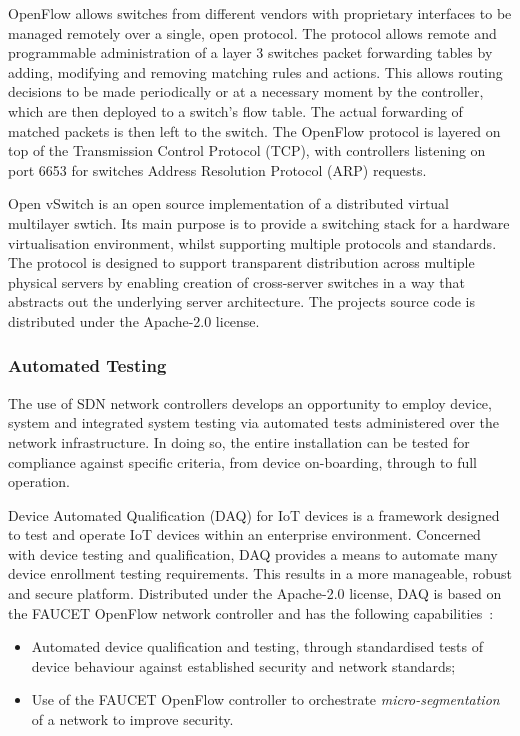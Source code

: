 \documentclass[11pt, oneside]{book}   	%
\begin{document}
OpenFlow allows switches from different vendors with proprietary interfaces to be managed remotely over a single, open protocol.
The protocol allows remote and programmable administration of a layer 3 switches packet forwarding tables by adding, modifying and removing matching rules and actions.
This allows routing decisions to be made periodically or at a necessary moment by the controller, which are then deployed to a switch's flow table.
The actual forwarding of matched packets is then left to the switch.
The OpenFlow protocol is layered on top of the Transmission Control Protocol (TCP), with controllers listening on port 6653 for switches Address Resolution Protocol (ARP) requests.\

Open vSwitch is an open source implementation of a distributed virtual multilayer swtich.
Its main purpose is to provide a switching stack for a hardware virtualisation environment, whilst supporting multiple protocols and standards.
The protocol is designed to support transparent distribution across multiple physical servers by enabling creation of cross-server switches in a way that abstracts out the underlying server architecture.
The projects source code is distributed under the Apache-2.0 license.

\subsubsection{Automated Testing}
The use of SDN network controllers develops an opportunity to employ device, system and integrated system testing via automated tests administered over the network infrastructure.
In doing so, the entire installation can be tested for compliance against specific criteria, from device on-boarding, through to full operation.

Device Automated Qualification (DAQ) for IoT devices is a framework designed to test and operate IoT devices within an enterprise environment.
Concerned with device testing and qualification, DAQ provides a means to automate many device enrollment testing requirements.
This results in a more manageable, robust and secure platform.
Distributed under the Apache-2.0 license, DAQ is based on the FAUCET OpenFlow network controller and has the following capabilities~\cite{daq1}:
\begin{itemize}
	\item Automated device qualification and testing, through standardised tests of device behaviour against established security and network standards; 
	\item Use of the FAUCET OpenFlow controller to orchestrate \emph{micro-segmentation} of a network to improve security.
\end{itemize}\
\end{document}
